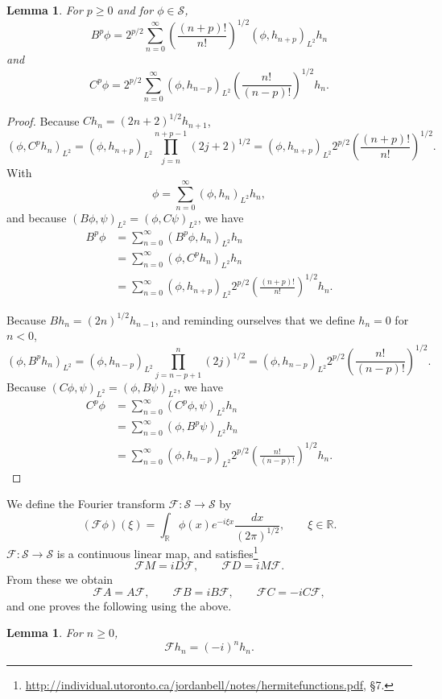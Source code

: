 \documentclass{article}
\newtheorem{lemma}[theorem]{Lemma}
\theoremstyle{definition}
\begin{document}
\begin{lemma}
For $p \geq 0$ and for $\phi \in \mathscr{S}$,
\[
B^p \phi = 2^{p/2}\sum_{n=0}^\infty \left( \frac{(n+p)!}{n!} \right)^{1/2} (\phi,h_{n+p})_{L^2}   h_n
\]
and
\[
C^p \phi =2^{p/2} \sum_{n=0}^\infty (\phi,h_{n-p})_{L^2}  \left( \frac{n!}{(n-p)!} \right)^{1/2} h_n.
\]
\end{lemma}
\begin{proof}
Because $Ch_n=(2n+2)^{1/2}h_{n+1}$,
\[
(\phi,C^p h_n)_{L^2}
=(\phi,h_{n+p})_{L^2} \prod_{j=n}^{n+p-1}(2j+2)^{1/2} 
=(\phi,h_{n+p})_{L^2} 2^{p/2}  \left( \frac{(n+p)!}{n!} \right)^{1/2}.
\]
With
\[
\phi = \sum_{n=0}^\infty (\phi,h_n)_{L^2} h_n,
\]
and because $(B\phi,\psi)_{L^2}=(\phi,C\psi)_{L^2}$, we have
\begin{align*}
B^p \phi &= \sum_{n=0}^\infty (B^p \phi,h_n)_{L^2} h_n\\
&=\sum_{n=0}^\infty  (\phi,C^p h_n)_{L^2} h_n\\
&=\sum_{n=0}^\infty (\phi,h_{n+p})_{L^2} 2^{p/2} \left( \frac{(n+p)!}{n!} \right)^{1/2} h_n.
\end{align*}

Because $Bh_n=(2n)^{1/2}h_{n-1}$, and reminding ourselves that we define $h_n=0$ for $n<0$,
\[
(\phi,B^ph_n)_{L^2}=(\phi,h_{n-p})_{L^2} \prod_{j=n-p+1}^n (2j)^{1/2}
=(\phi,h_{n-p})_{L^2} 2^{p/2} \left( \frac{n!}{(n-p)!} \right)^{1/2}.
\]
Because $(C\phi,\psi)_{L^2}=(\phi,B\psi)_{L^2}$, we have
\begin{align*}
C^p\phi&=\sum_{n=0}^\infty (C^p\phi,\psi)_{L^2} h_n\\
&=\sum_{n=0}^\infty (\phi,B^p\psi)_{L^2} h_n\\
&=\sum_{n=0}^\infty (\phi,h_{n-p})_{L^2} 2^{p/2} \left( \frac{n!}{(n-p)!} \right)^{1/2} h_n.
\end{align*}
\end{proof}

We define the Fourier transform $\mathscr{F}:\mathscr{S} \to \mathscr{S}$ by
\[
(\mathscr{F}\phi)(\xi) = \int_{\mathbb{R}} \phi(x) e^{-i\xi x} \frac{dx}{(2\pi)^{1/2}},\qquad \xi \in \mathbb{R}.
\]
$\mathscr{F}:\mathscr{S} \to \mathscr{S}$ is a continuous linear map, and satisfies\footnote{\url{http://individual.utoronto.ca/jordanbell/notes/hermitefunctions.pdf},
\S 7.}
\[
\mathscr{F}M = iD\mathscr{F},\qquad \mathscr{F}D = iM\mathscr{F}. 
\]
From these we obtain
\[
\mathscr{F}A=A\mathscr{F},\qquad \mathscr{F}B=iB\mathscr{F},\qquad \mathscr{F}C=-iC\mathscr{F},
\]
and one proves the following using the above.

\begin{lemma}
For $n \geq 0$,
\[
\mathscr{F}h_n = (-i)^n h_n.
\] 
\end{lemma}
\end{document}
